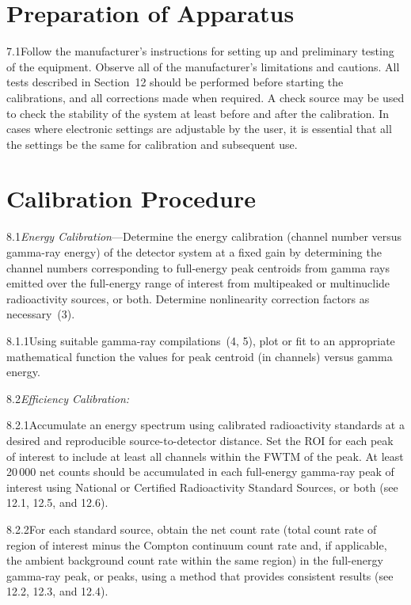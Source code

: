 \documentclass[12pt]{article}
\begin{document}
\section{Preparation of Apparatus}

7.1\quad Follow the manufacturer's instructions for setting up and preliminary testing of
the equipment. Observe all of the manufacturer's limitations and cautions. All tests
described in Section~12 should be performed before starting the calibrations, and all
corrections made when required. A check source may be used to check the stability of the
system at least before and after the calibration. In cases where electronic settings are
adjustable by the user, it is essential that all the settings be the same for calibration
and subsequent use.

\section{Calibration Procedure}

8.1\quad \textit{Energy Calibration}---Determine the energy calibration (channel number
versus gamma-ray energy) of the detector system at a fixed gain by determining the
channel numbers corresponding to full-energy peak centroids from gamma rays emitted over
the full-energy range of interest from multipeaked or multinuclide radioactivity sources,
or both. Determine nonlinearity correction factors as necessary~(3).

8.1.1\quad Using suitable gamma-ray compilations~(4, 5), plot or fit to an appropriate
mathematical function the values for peak centroid (in channels) versus gamma energy.

8.2\quad \textit{Efficiency Calibration:}

8.2.1\quad Accumulate an energy spectrum using calibrated radioactivity standards at a
desired and reproducible source-to-detector distance. Set the ROI for each peak of
interest to include at least all channels within the FWTM of the peak. At least 20\,000
net counts should be accumulated in each full-energy gamma-ray peak of interest using
National or Certified Radioactivity Standard Sources, or both (see 12.1, 12.5, and 12.6).

8.2.2\quad For each standard source, obtain the net count rate (total count rate of region
of interest minus the Compton continuum count rate and, if applicable, the ambient
background count rate within the same region) in the full-energy gamma-ray peak, or
peaks, using a method that provides consistent results (see 12.2, 12.3, and 12.4).
\end{document}
